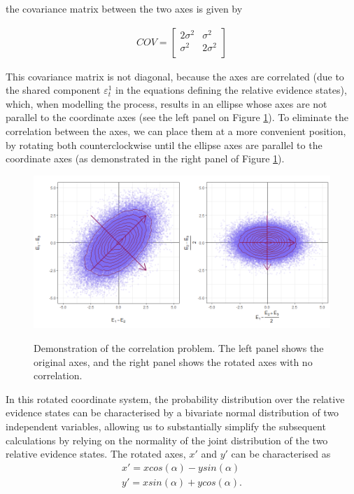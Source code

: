 \documentclass[11pt,a4paper]{article}
\begin{document}
the covariance matrix between the two axes is given by

\begin{equation}
\begin{array}{l}
COV = \begin{bmatrix}
       2\sigma^2 & \sigma^2 \\[0.3em]
       \sigma^2 & 2\sigma^2 \\[0.3em]
     \end{bmatrix}
\end{array} 
\label{eq:covariance}
\end{equation}

This covariance matrix is not diagonal, because the axes are correlated (due to the shared component $\varepsilon_{t}^{1}$ in the equations defining the relative evidence states), which, when modelling the process, results in an ellipse whose axes are not parallel to the coordinate axes (see the left panel on Figure \ref{fig:rotate}).  To eliminate the correlation between the axes, we can place them at a more convenient position, by rotating both counterclockwise until the ellipse axes are parallel to the coordinate axes (as demonstrated in the right panel of Figure \ref{fig:rotate}). 

\begin{figure}[htp!]
\captionsetup{justification=centering}
\centering
\caption{Demonstration of the correlation problem. The left panel shows the original axes, and the right panel shows the rotated axes with no correlation.}
\includegraphics[width=1\textwidth]{./rotate.png}
\label{fig:rotate}
\end{figure}
 
In this rotated coordinate system, the probability distribution over the relative evidence states can be characterised by a bivariate normal distribution of two independent variables, allowing us to substantially simplify the subsequent calculations by relying on the normality of the joint distribution of the two relative evidence states. The rotated axes, $x'$ and $y'$ can be characterised \cite{algebra} as
\begin{equation}
\begin{array}{l}
\displaystyle x' = x cos(\alpha) - y sin(\alpha)\\
\displaystyle y' = x sin(\alpha) + y cos(\alpha).\\
\end{array} 
\label{eq:axes2}
\end{equation}
\end{document}
